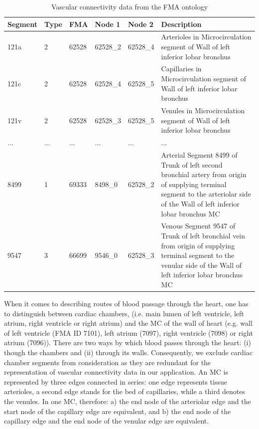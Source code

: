 \begin{table}
\caption{Vascular connectivity data from the FMA ontology}
\begin{tabular}{|l|l|l|l|l|p{7cm}|}
  \hline
  Segment & Type & FMA & Node 1 & Node 2 & Description \\
  \hline
  121a & 2 & 62528 & 62528\_2 & 62528\_4 & Arterioles in Microcirculation segment of Wall of left inferior lobar bronchus \\
  121c & 2 & 62528 & 62528\_4 & 62528\_5 & Capillaries in Microcirculation segment of Wall of left inferior lobar bronchus\\
  121v & 2 & 62528 & 62528\_3 & 62528\_5 & Venules in Microcirculation segment of Wall of left inferior lobar bronchus\\
  ... &... & ...   & ...      & ...      & ...\\
  8499 & 1 & 69333 & 8498\_0 & 62528\_2  & Arterial Segment 8499 of Trunk
of left second bronchial artery from origin of supplying terminal segment
to the arteriolar side of the Wall of left inferior lobar bronchus
MC\\
  9547 & 3 & 66699 & 9546\_0 & 62528\_3 & Venous Segment 9547 of Trunk of
left bronchial vein from origin of supplying terminal segment to the
venular side of the Wall of left inferior lobar bronchus MC \\
  \hline
\end{tabular}
\label{tab:vascular-connectivity}
\end{table}

When it comes to describing routes of blood passage through the heart, one has to distinguish between cardiac chambers, (i.e. main lumen of left ventricle, left atrium, right ventricle or right atrium) and the MC of the wall of heart (e.g. wall of left ventricle (FMA ID 7101), left atrium (7097), right ventricle (7098) or right atrium (7096)). There are two ways by which blood passes through the heart: (i) though the chambers and (ii) through its walls. Consequently, we exclude cardiac chamber segments from consideration as they are redundant for the representation of vascular connectivity data in our application.
An MC is represented by three edges connected in series: one edge represents tissue arterioles, a second edge stands for the bed of
capillaries, while a third denotes the venules. In one MC, therefore: a) the end node of the arteriolar edge and the start node of the
capillary edge are equivalent, and b) the end node of the capillary edge and the end node of the venular
edge are equivalent. 

